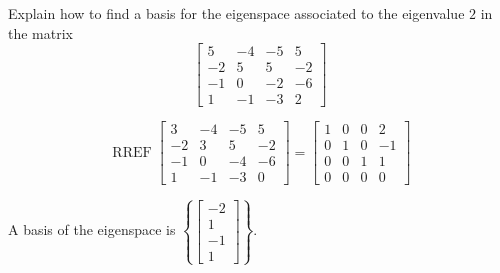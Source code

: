 
\begin{exerciseStatement}


Explain how to find a basis for the eigenspace associated to the eigenvalue \( 2 \) in the matrix \[ \left[\begin{array}{cccc}
5 & -4 & -5 & 5 \\
-2 & 5 & 5 & -2 \\
-1 & 0 & -2 & -6 \\
1 & -1 & -3 & 2
\end{array}\right] \]


\end{exerciseStatement}
    
\begin{exerciseAnswer} 


\[\operatorname{RREF} \left[\begin{array}{cccc}
3 & -4 & -5 & 5 \\
-2 & 3 & 5 & -2 \\
-1 & 0 & -4 & -6 \\
1 & -1 & -3 & 0
\end{array}\right] = \left[\begin{array}{cccc}
1 & 0 & 0 & 2 \\
0 & 1 & 0 & -1 \\
0 & 0 & 1 & 1 \\
0 & 0 & 0 & 0
\end{array}\right] \]



A basis of the eigenspace is \( \left\{ \left[\begin{array}{c}
-2 \\
1 \\
-1 \\
1
\end{array}\right] \right\} \).


\end{exerciseAnswer}
    
